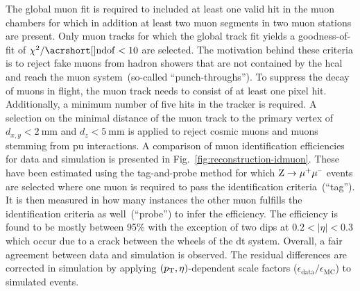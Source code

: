 The global muon fit is required to included at least one valid hit in the muon chambers for which in addition at least two muon segments in two muon stations are present. Only muon tracks for which the global track fit yields a goodness-of-fit of $\chi^2/\mathrm{\gls{ndof}}<10$ are selected. The motivation behind these criteria is to reject fake muons from hadron showers that are not contained by the \gls{hcal} and reach the muon system~(so-called ``punch-throughs''). To suppress the decay of muons in flight, the muon track needs to consist of at least one pixel hit. Additionally, a minimum number of five hits in the tracker is required. A selection on the minimal distance of the muon track to the primary vertex of $d_{x,y}<2~\mathrm{mm}$ and $d_{z}<5~\mathrm{mm}$ is applied to reject cosmic muons and muons stemming from \gls{pu} interactions. A comparison of muon identification efficiencies for data and simulation is presented in Fig.~\ref{fig:reconstruction-idmuon}. These have been estimated using the tag-and-probe method for which $\mathrm{Z}\to\mu^{\rmplus}\mu^{\rmminus}$ events are selected where one muon is required to pass the identification criteria~(``tag''). It is then measured in how many instances the other muon fulfills the identification criteria as well~(``probe'') to infer the efficiency. The efficiency is found to be mostly between 95\% with the exception of two dips at $0.2<|\eta|<0.3$ which occur due to a crack between the wheels of the \gls{dt} system. Overall, a fair agreement between data and simulation is observed. The residual differences are corrected in simulation by applying $(p_\textrm{T},\eta)$-dependent scale factors ($\epsilon_\mathrm{data}/\epsilon_\mathrm{MC}$) to simulated events.

